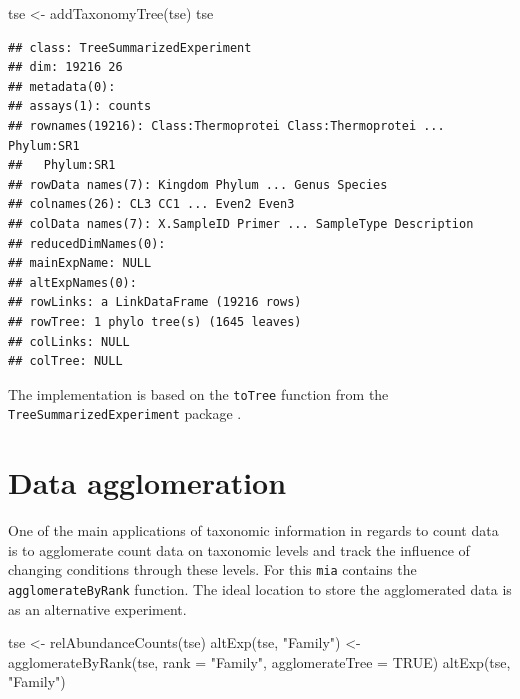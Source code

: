 \documentclass[
]{book}
\newenvironment{Shaded}{\begin{snugshade}}{\end{snugshade}}
\newcommand{\AttributeTok}[1]{\textcolor[rgb]{0.77,0.63,0.00}{#1}}
\newcommand{\ConstantTok}[1]{\textcolor[rgb]{0.00,0.00,0.00}{#1}}
\newcommand{\FunctionTok}[1]{\textcolor[rgb]{0.00,0.00,0.00}{#1}}
\newcommand{\NormalTok}[1]{#1}
\newcommand{\OtherTok}[1]{\textcolor[rgb]{0.56,0.35,0.01}{#1}}
\newcommand{\StringTok}[1]{\textcolor[rgb]{0.31,0.60,0.02}{#1}}
\begin{document}
\begin{Shaded}
\begin{Highlighting}[]
\NormalTok{tse }\OtherTok{\textless{}{-}} \FunctionTok{addTaxonomyTree}\NormalTok{(tse)}
\NormalTok{tse}
\end{Highlighting}
\end{Shaded}

\begin{verbatim}
## class: TreeSummarizedExperiment 
## dim: 19216 26 
## metadata(0):
## assays(1): counts
## rownames(19216): Class:Thermoprotei Class:Thermoprotei ... Phylum:SR1
##   Phylum:SR1
## rowData names(7): Kingdom Phylum ... Genus Species
## colnames(26): CL3 CC1 ... Even2 Even3
## colData names(7): X.SampleID Primer ... SampleType Description
## reducedDimNames(0):
## mainExpName: NULL
## altExpNames(0):
## rowLinks: a LinkDataFrame (19216 rows)
## rowTree: 1 phylo tree(s) (1645 leaves)
## colLinks: NULL
## colTree: NULL
\end{verbatim}

The implementation is based on the \texttt{toTree} function from the
\texttt{TreeSummarizedExperiment} package \citep{R-TreeSummarizedExperiment}.

\hypertarget{data-agglomeration}{%
\section{Data agglomeration}\label{data-agglomeration}}

One of the main applications of taxonomic information in regards to count data
is to agglomerate count data on taxonomic levels and track the influence of
changing conditions through these levels. For this \texttt{mia} contains the
\texttt{agglomerateByRank} function. The ideal location to store the agglomerated data
is as an alternative experiment.

\begin{Shaded}
\begin{Highlighting}[]
\NormalTok{tse }\OtherTok{\textless{}{-}} \FunctionTok{relAbundanceCounts}\NormalTok{(tse)}
\FunctionTok{altExp}\NormalTok{(tse, }\StringTok{"Family"}\NormalTok{) }\OtherTok{\textless{}{-}} \FunctionTok{agglomerateByRank}\NormalTok{(tse, }\AttributeTok{rank =} \StringTok{"Family"}\NormalTok{,}
                                           \AttributeTok{agglomerateTree =} \ConstantTok{TRUE}\NormalTok{)}
\FunctionTok{altExp}\NormalTok{(tse, }\StringTok{"Family"}\NormalTok{)}
\end{Highlighting}
\end{Shaded}
\end{document}
